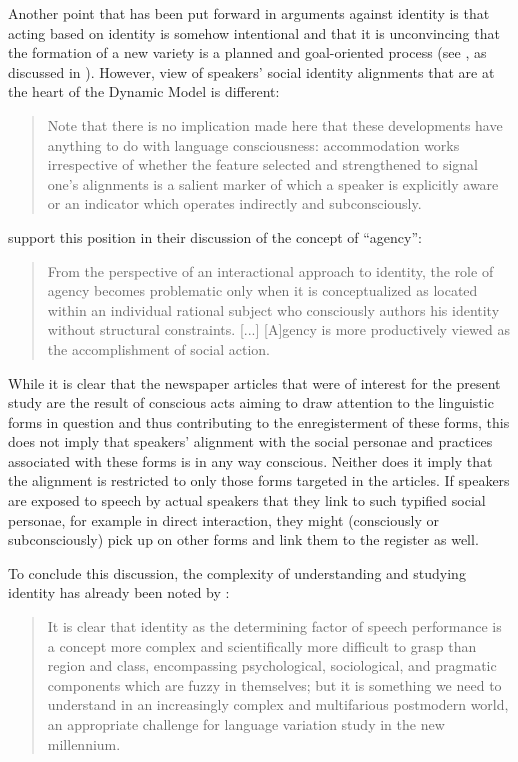 Another point that has been put forward in arguments against identity is that acting based on identity is somehow intentional and that it is unconvincing that the formation of a new variety is a planned and goal-oriented process (see \citealt{Mufwene2008}, as discussed in ). However,  view of speakers’ social identity alignments that are at the heart of the Dynamic Model is different:

\begin{quote}
Note that there is no implication made here that these developments have anything to do with language consciousness: accommodation works irrespective of whether the feature selected and strengthened to signal one’s alignments is a salient marker of which a speaker is explicitly aware or an indicator which operates indirectly and subconsciously.
\end{quote}


\citet[606]{Bucholtz2005} support this position in their discussion of the concept of “agency”:


\begin{quote}
From the perspective of an interactional approach to identity, the role of agency becomes problematic only when it is conceptualized as located with\-in an individual rational subject who consciously authors his identity without structural constraints. [...] [A]gency is more productively viewed as the accomplishment of social action.
\end{quote}


While it is clear that the newspaper articles that were of interest for the present study are the result of conscious acts aiming to draw attention to the linguistic forms in question and thus contributing to the enregisterment of these forms, this does not imply that speakers’ alignment with the social personae and practices associated with these forms is in any way conscious. Neither does it imply that the alignment is restricted to only those forms targeted in the articles. If speakers are exposed to speech by actual speakers that they link to such typified social personae, for example in direct interaction, they might (consciously or subconsciously) pick up on other forms and link them to the register as well.


To conclude this discussion, the complexity of understanding and studying identity has already been noted by \citet[361]{Schneider2000}:

\begin{quote}
It is clear that identity as the determining factor of speech performance is a concept more complex and scientifically more difficult to grasp than region and class, encompassing psychological, sociological, and pragmatic components which are fuzzy in themselves; but it is something we need to understand in an increasingly complex and multifarious postmodern world, an appropriate challenge for language variation study in the new millennium.
\end{quote}


